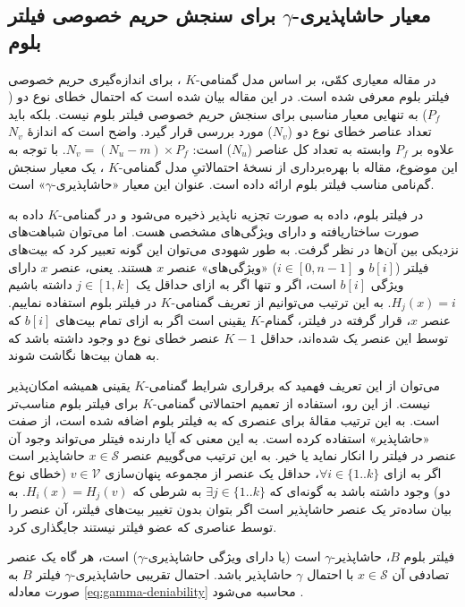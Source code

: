 \subsection{معیار 
	حاشاپذیری-$\gamma$ برای
	سنجش حریم خصوصی فیلتر بلوم}
\label{gamma-deniability}

در مقاله \cite{Bianchi2012} معیاری کمّی، بر اساس مدل گمنامی-$K$ 
\cite{Sweeney2002}،
برای اندازه‌گیری حریم خصوصی فیلتر بلوم معرفی شده است. در این مقاله بیان شده است که احتمال خطای نوع دو ($P_f$) به تنهایی معیار مناسبی برای سنجش حریم خصوصی فیلتر بلوم نیست. بلکه باید تعداد عناصر خطای نوع دو ($N_v$) مورد بررسی قرار گیرد. واضح است که اندازهٔ $N_v$ علاوه بر $P_f$ وابسته به تعداد کل عناصر ($N_u$) است:
$N_v=(N_u-m)\times P_f$.
با توجه به این موضوع، مقاله \cite{Bianchi2012} با بهره‌برداری از نسخهٔ احتمالاتیِ مدل گمنامی-$K$
\cite{Lodha2008}،
یک معیار سنجش گم‌نامی مناسب فیلتر بلوم ارائه داده است. عنوان این معیار «حاشاپذیری-$\gamma$» است. 

در فیلتر بلوم، داده به صورت تجزیه ناپذیر ذخیره می‌شود و در گمنامی-$K$ داده به صورت ساختاریافته و دارای ویژگی‌های مشخصی هست. اما می‌توان شباهت‌های نزدیکی بین آن‌ها در نظر گرفت. به طور شهودی می‌توان این گونه تعبیر کرد که بیت‌های فیلتر ($b[i]$ و $i\in[0,n-1]$) «ویژگی‌های» عنصر $x$ هستند. یعنی، عنصر $x$ دارای ویژگی $b[i]$ است، اگر و تنها اگر به ازای حداقل یک 
$j\in[1,k]$ داشته باشیم 
$H_j(x)=i$.
به این ترتیب می‌توانیم از تعریف گمنامی-$K$ در فیلتر بلوم استفاده نماییم. عنصر $x$، قرار گرفته در فیلتر، گمنام-$K$ یقینی است اگر به ازای تمام بیت‌های $b[i]$  که توسط این عنصر یک شده‌اند، حداقل $K-1$ عنصر خطای نوع دو وجود داشته باشد که به همان بیت‌ها نگاشت شوند.

می‌توان از این تعریف فهمید که برقراری شرایط گمنامی-$K$ یقینی همیشه امکان‌پذیر نیست. از این رو، استفاده از تعمیم احتمالاتی گمنامی-$K$ 
\cite{Lodha2008} 
برای فیلتر بلوم مناسب‌تر است. به این ترتیب مقالهٔ \cite{Bianchi2012} برای عنصری که به فیلتر بلوم اضافه شده است، از صفت «حاشاپذیر» استفاده کرده است.  به این معنی که آیا دارنده فیتلر می‌تواند وجود آن عنصر در فیلتر را انکار نماید یا خیر. به این ترتیب می‌گوییم عنصر $x\in \mathcal{S}$ حاشاپذیر است اگر به ازای 
$\forall i \in \{1..k\}$،
حداقل یک عنصر از مجموعه پنهان‌سازی $v\in \mathcal{V}$ (خطای نوع دو) وجود داشته باشد به گونه‌ای که 
$\exists j \in \{1..k\}$
به شرطی که 
$H_i(x) = H_j(v)$.
به بیان ساده‌تر یک عنصر حاشا‌پذیر است اگر بتوان بدون تغییر بیت‌های فیلتر، آن عنصر را توسط عناصری که عضو فیلتر نیستند جایگذاری کرد. 

فیلتر بلوم $B$، حاشاپذیر-$\gamma$ است (یا دارای ویژگی حاشاپذیری-$\gamma$) است، هر گاه یک عنصر تصادفی آن $x\in \mathcal{S}$ با احتمال $\gamma$ حاشاپذیر باشد. احتمال تقریبی حاشاپذیری-$\gamma$ فیلتر $B$ به صورت معادله \eqref{eq:gamma-deniability} محاسبه می‌شود  \cite{Bianchi2012}.

